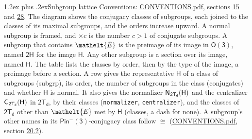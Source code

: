 \documentclass[10pt,a4paper]{article}
\makeatletter
\renewcommand\section{\@startsection{section}{1}{\z@}{-3ex plus -1ex minus -.2ex}%
  {1.2ex plus .2ex}{\normalfont\large\sffamily\bfseries\color{parttitle}}}
\numberwithin{equation}{section}
\newcommand{\eltfont}[1]{{\let\sigma\eltsigma\mathelt{#1}}}
\newcommand{\grp}[1]{\mathsf{#1}}
\newcommand{\cls}[1]{\eltfont{#1}}
\newcommand{\elt}[1]{\eltfont{#1}}
\newcommand{\samecls}{\cong}
\newcommand{\barred}[1]{\bar{#1}}
\newcommand{\hairsp}{\mkern1mu}
\makeatother
\begin{document}
\section{Subgroup lattice}\label{s:subgroups}
Conventions: \href{../../CONVENTIONS.pdf}{CONVENTIONS.pdf}, sections \href{../../../rotation/CONVENTIONS.pdf\#conv.15}{15} and \href{../../CONVENTIONS.pdf\#conv.28}{28}.
The diagram shows the conjugacy classes of subgroups, each joined to the classes of its maximal subgroups, and the orders increase upward. \label{n:index.conjugates.c}\label{n:mark.conjugates}A normal subgroup is framed, and ${\times}c$ is the number $c > 1$ of conjugate subgroups. \label{n:group.H}A subgroup that contains $\elt{\barred{E}}$ is the preimage of its image in $\grp{O(3)}$, named $\grp{2H}$ for the image $\grp{H}$. Any other subgroup is a section over its image, named $\grp{H}$. The table lists the classes by order, then by the type of the image, a preimage before a section. \label{n:head.subgroup}\label{n:head.order}\label{n:head.conjugates}\label{n:head.normal}A row gives the representative $\grp{H}$ of a class of subgroups (subgrp), its order, the number of subgroups in the class (conjugates) and whether $\grp{H}$ is normal. \label{n:group.normalizer}\label{n:group.centralizer}\label{n:head.classes}It also gives the normalizer $\grp{N}_{\hairsp \grp{2T_{d}}}(\grp{H})$ and the centralizer $\grp{C}_{\hairsp \grp{2T_{d}}}(\grp{H})$ in $\grp{2T_{d}}$, by their classes (\texttt{normalizer}, \texttt{centralizer}), and the classes of $\grp{2T_{d}}$ other than $\cls{E}$ met by $\grp{H}$ (classes, a dash for none). A subgroup's other names in its \href{Pinminus3.pdf}{$\grp{Pin^{-}(3)}$}-conjugacy class follow $\samecls$ (\href{../../CONVENTIONS.pdf}{CONVENTIONS.pdf}, section \href{../../CONVENTIONS.pdf\#conv.20.2}{20.2}).
\end{document}

